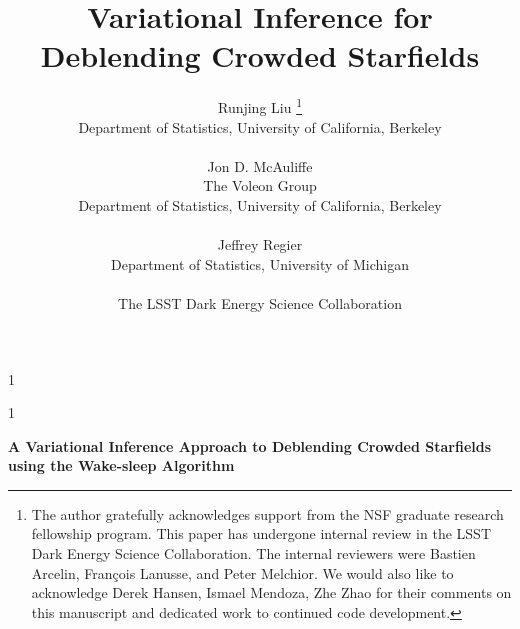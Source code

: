 \documentclass[12pt]{article}
\date{\vspace{-10px}}
\newcommand{\blind}{1}
\begin{document}
%

\def\spacingset#1{\renewcommand{\baselinestretch}%
{#1}\small\normalsize} \spacingset{1}


\blind
{
  \title{  \vspace{-30px}
\bf Variational Inference for Deblending Crowded Starfields}
  \author{Runjing Liu
  \thanks{The author gratefully acknowledges support from the NSF graduate research fellowship program.  
  This paper has undergone internal review in the LSST Dark Energy Science Collaboration. 
  The internal reviewers were 
  Bastien Arcelin,
  Fran\c{c}ois Lanusse, and 
  Peter Melchior. 
  We would also like to acknowledge Derek Hansen, Ismael Mendoza, Zhe Zhao for their comments on this manuscript and dedicated work to continued code development.
  }
  \hspace{.2cm}\\
    Department of Statistics, University of California, Berkeley\\
    \\
    Jon D. McAuliffe \\
    The Voleon Group \\
    Department of Statistics, University of California, Berkeley\\
    \\
    Jeffrey Regier \\
    Department of Statistics, University of Michigan\\
    \\
    The LSST Dark Energy Science Collaboration
    }
  \maketitle
} \fi

\blind
{
  \bigskip
  \bigskip
  \bigskip
  \begin{center}
    {\LARGE\bf A Variational Inference Approach to Deblending Crowded Starfields using the Wake-sleep Algorithm}
\end{center}
  \medskip
} \fi
\end{document}

